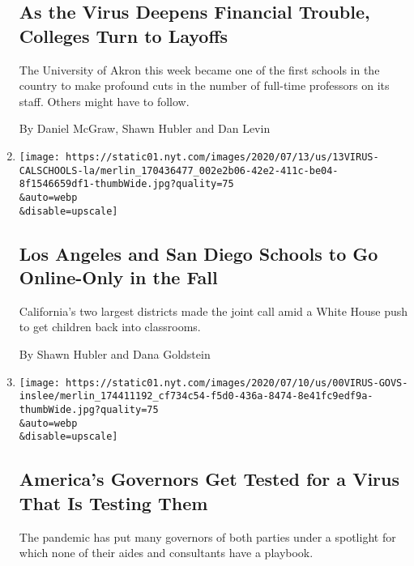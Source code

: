 \begin{enumerate}
{  \subsection{As the Virus Deepens Financial Trouble, Colleges Turn to
  Layoffs}\label{as-the-virus-deepens-financial-trouble-colleges-turn-to-layoffs}}

  The University of Akron this week became one of the first schools in
  the country to make profound cuts in the number of full-time
  professors on its staff. Others might have to follow.

  By Daniel McGraw, Shawn Hubler and Dan Levin
\item
  \href{/2020/07/13/us/lausd-san-diego-school-reopening.html}{}

  \texttt{[image: https://static01.nyt.com/images/2020/07/13/us/13VIRUS-CALSCHOOLS-la/merlin\_170436477\_002e2b06-42e2-411c-be04-8f1546659df1-thumbWide.jpg?quality=75\\\&auto=webp\\\&disable=upscale]}

  \hypertarget{los-angeles-and-san-diego-schools-to-go-online-only-in-the-fall}{%
  \subsection{Los Angeles and San Diego Schools to Go Online-Only in the
  Fall}\label{los-angeles-and-san-diego-schools-to-go-online-only-in-the-fall}}

  California's two largest districts made the joint call amid a White
  House push to get children back into classrooms.

  By Shawn Hubler and Dana Goldstein
\item
  \href{/2020/07/13/us/coronavirus-governors.html}{}

  \texttt{[image: https://static01.nyt.com/images/2020/07/10/us/00VIRUS-GOVS-inslee/merlin\_174411192\_cf734c54-f5d0-436a-8474-8e41fc9edf9a-thumbWide.jpg?quality=75\\\&auto=webp\\\&disable=upscale]}

  \hypertarget{americas-governors-get-tested-for-a-virus-that-is-testing-them}{%
  \subsection{America's Governors Get Tested for a Virus That Is Testing
  Them}\label{americas-governors-get-tested-for-a-virus-that-is-testing-them}}

  The pandemic has put many governors of both parties under a spotlight
  for which none of their aides and consultants have a playbook.


\end{enumerate}
